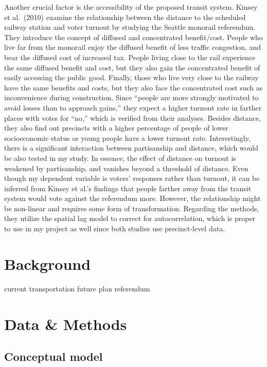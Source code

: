 \documentclass[
]{article}
\begin{document}
Another crucial factor is the accessibility of the proposed transit
system. Kinsey et al.~(2010) examine the relationship between the
distance to the scheduled railway station and voter turnout by studying
the Seattle monorail referendum. They introduce the concept of diffused
and concentrated benefit/cost. People who live far from the monorail
enjoy the diffused benefit of less traffic congestion, and bear the
diffused cost of increased tax. People living close to the rail
experience the same diffused benefit and cost, but they also gain the
concentrated benefit of easily accessing the public good. Finally, those
who live very close to the railway have the same benefits and costs, but
they also face the concentrated cost such as inconvenience during
construction. Since ``people are more strongly motivated to avoid losses
than to approach gains,'' they expect a higher turnout rate in farther
places with votes for ``no,'' which is verified from their analyses.
Besides distance, they also find out precincts with a higher percentage
of people of lower socioeconomic status or young people have a lower
turnout rate. Interestingly, there is a significant interaction between
partisanship and distance, which would be also tested in my study. In
essence, the effect of distance on turnout is weakened by partisanship,
and vanishes beyond a threshold of distance. Even though my dependent
variable is voters' responses rather than turnout, it can be inferred
from Kinsey et al.'s findings that people farther away from the transit
system would vote against the referendum more. However, the relationship
might be non-linear and requires some form of transformation. Regarding
the methods, they utilize the spatial lag model to correct for
autocorrelation, which is proper to use in my project as well since both
studies use precinct-level data.

\hypertarget{background}{%
\section{Background}\label{background}}

current transportation future plan referendum

\hypertarget{data-methods}{%
\section{Data \& Methods}\label{data-methods}}

\hypertarget{conceptual-model}{%
\subsection{Conceptual model}\label{conceptual-model}}
\end{document}
